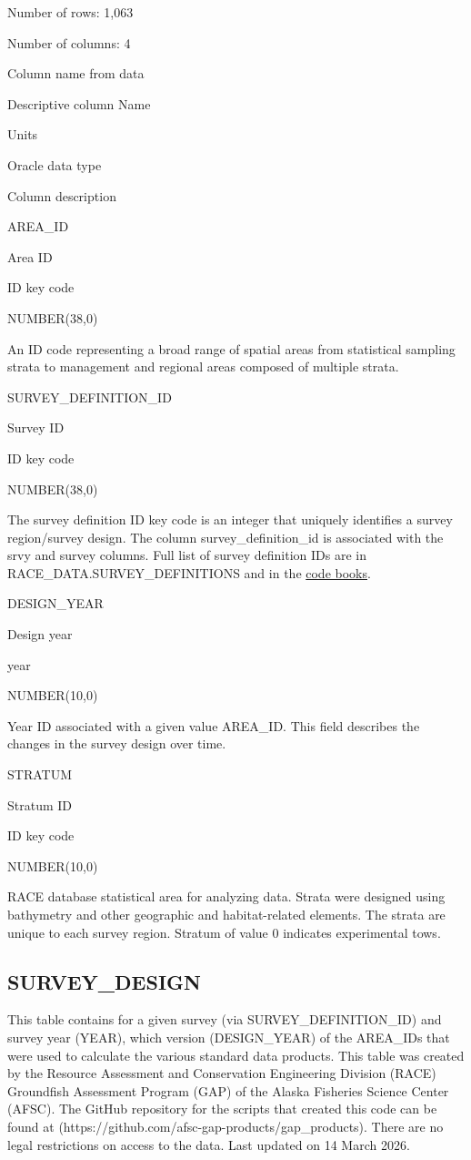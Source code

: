 \documentclass[
  letterpaper,
  oneside,
  open=any]{scrbook}
\begin{document}
Number of rows: 1,063

Number of columns: 4

Column name from data

Descriptive column Name

Units

Oracle data type

Column description

AREA\_ID

Area ID

ID key code

NUMBER(38,0)

An ID code representing a broad range of spatial areas from statistical
sampling strata to management and regional areas composed of multiple
strata.

SURVEY\_DEFINITION\_ID

Survey ID

ID key code

NUMBER(38,0)

The survey definition ID key code is an integer that uniquely identifies
a survey region/survey design. The column survey\_definition\_id is
associated with the srvy and survey columns. Full list of survey
definition IDs are in RACE\_DATA.SURVEY\_DEFINITIONS and in the
\href{https://www.fisheries.noaa.gov/resource/document/groundfish-survey-species-code-manual-and-data-codes-manual}{code
books}.

DESIGN\_YEAR

Design year

year

NUMBER(10,0)

Year ID associated with a given value AREA\_ID. This field describes the
changes in the survey design over time.

STRATUM

Stratum ID

ID key code

NUMBER(10,0)

RACE database statistical area for analyzing data. Strata were designed
using bathymetry and other geographic and habitat-related elements. The
strata are unique to each survey region. Stratum of value 0 indicates
experimental tows.

\subsection{SURVEY\_DESIGN}\label{survey_design}

This table contains for a given survey (via SURVEY\_DEFINITION\_ID) and
survey year (YEAR), which version (DESIGN\_YEAR) of the AREA\_IDs that
were used to calculate the various standard data products. This table
was created by the Resource Assessment and Conservation Engineering
Division (RACE) Groundfish Assessment Program (GAP) of the Alaska
Fisheries Science Center (AFSC). The GitHub repository for the scripts
that created this code can be found at
(https://github.com/afsc-gap-products/gap\_products). There are no legal
restrictions on access to the data. Last updated on 14 March 2026.
\end{document}
